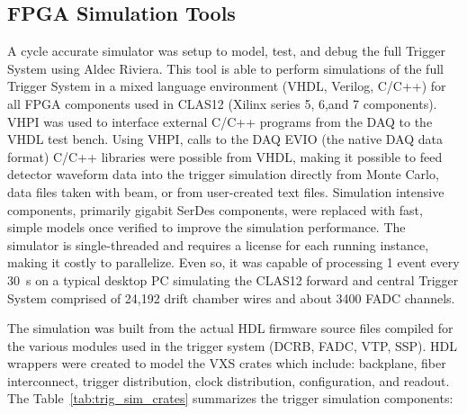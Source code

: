 \subsection{FPGA Simulation Tools}

A cycle accurate simulator was setup to model, test, and debug the full Trigger System using Aldec Riviera. This tool is able to perform simulations of the full Trigger System in a mixed language environment (VHDL, Verilog, C/C++) for all FPGA components used in CLAS12 (Xilinx series 5, 6,and 7 components). VHPI was used to interface external C/C++ programs from the DAQ to the VHDL test bench. Using VHPI, calls to the DAQ EVIO (the native DAQ data format) C/C++ libraries were possible from VHDL, making it possible to feed detector waveform data into the trigger simulation directly from Monte Carlo, data files taken with beam, or from user-created text files. Simulation intensive components, primarily gigabit SerDes components, were replaced with fast, simple models once verified to improve the simulation performance. The simulator is single-threaded and requires a license for each running instance, making it costly to parallelize. Even so, it was capable of processing 1 event every 30~s on a typical desktop PC simulating the CLAS12 forward and central Trigger System comprised of 24,192 drift chamber wires and about 3400 FADC channels.

The simulation was built from the actual HDL firmware source files compiled for the various modules used in the trigger system (DCRB, FADC, VTP, SSP). HDL wrappers were created to model the VXS crates which include: backplane, fiber interconnect, trigger distribution, clock distribution, configuration, and readout. The Table~\ref{tab:trig_sim_crates} summarizes the trigger simulation components:

